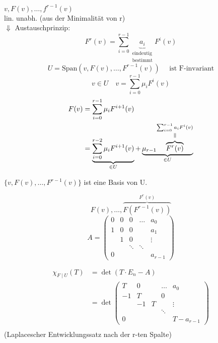 \documentclass[titlepage,12pt,a4paper,ngerman]{report}
\newcommand{\verteq}{\rotatebox{90}{$\,=$}}
\newcommand{\equaltoup}[2]{\overset{\scriptstyle\underset{\mkern4mu\verteq}{#2}}{#1}}
\newcommand{\tx}[1]{\textrm{#1}}
\newcommand{\ub}[1]{\underbrace{#1}}
\newcommand{\ob}[1]{\overbrace{#1}}
\begin{document}
$v, F(v) , \dots , f^{r-1}(v) $\\
lin. unabh. (aus der Minimalität von r)\\
$\Downarrow$ Austauschprinzip:
$$F^r(v) = \sum^{r-1}_{i=0} \ub{a_i}_{\substack{\textrm{eindeutig} \\ \textrm{bestimmt}}} F^i(v)$$
$$ U = \tx{Span} (v, F(v), \dots , F^{r-1}(v)) \quad \tx{ ist F-invariant}$$
$$v\in U \quad v = \sum^{r-1}_{i=0} \mu_i F^i(v)$$
\begin{align*}
F(v) & = \sum^{r-1}_{i=0} \mu_i F^{i+1}(v) \\
& = \ub{\sum^{r-2}_{i=0} \mu_i F^{i+1}(v)}_{\in U} + \ub{\mu_{r-1} \equaltoup{\ob{F^r(v)}}{\sum^{r-1}_{i=0} a_i F^i(v)}}_{\in U }
\end{align*}

$\{v, F(v), \dots , F^{r-1}(v)\}$ ist eine Basis von U.

$$ F(v) , \dots , \ob{F(F^{r-1}(v))}^{F^r(v)}$$
$$A = \begin{pmatrix}
0 & 0 & 0 & \dots & a_0 \\
1 & 0 & 0 &  & a_1 \\
& 1 & 0 & & \vdots \\
&   & \ddots & \ddots & \\
0 &   &   &   & a_{r-1}
\end{pmatrix} $$

\begin{align*}
\chi_{F\mid U } (T) &= \det (T\cdot E_n -A)\\
&= \det\begin{pmatrix}
T & 0 & & \dots  & a_0 \\
-1 & T & & 0\\
& -1 & T  & & \vdots \\
& & & \ddots \\
0 & & & & T- a_{r-1}
\end{pmatrix} \\
\end{align*}
(Laplacescher Entwicklungssatz nach der r-ten Spalte)\\
\end{document}

